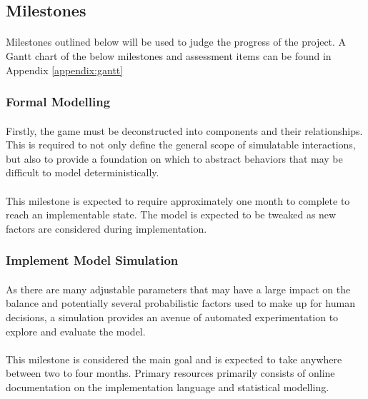 \subsection{Milestones}

\paragraph{} Milestones outlined below will be used to judge the progress of the project. A Gantt chart of the below milestones and assessment items can be found in Appendix \ref{appendix:gantt}

\subsubsection{Formal Modelling}

\paragraph{} Firstly, the game must be deconstructed into components and their relationships. This is required to not only define the general scope of simulatable interactions, but also to provide a foundation on which to abstract behaviors that may be difficult to model deterministically.

\paragraph{} This milestone is expected to require approximately one month to complete to reach an implementable state. The model is expected to be tweaked as new factors are considered during implementation.

\subsubsection{Implement Model Simulation}

\paragraph{} As there are many adjustable parameters that may have a large impact on the balance and potentially several probabilistic factors used to make up for human decisions, a simulation provides an avenue of automated experimentation to explore and evaluate the model. 

\paragraph{} This milestone is considered the main goal and is expected to take anywhere between two to four months. Primary resources primarily consists of online documentation on the implementation language and statistical modelling.

